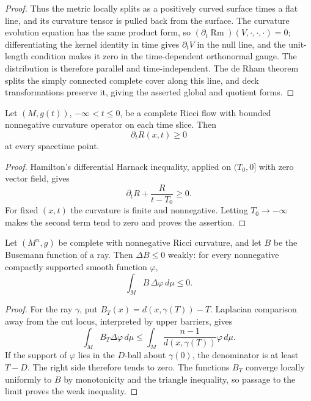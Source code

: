\begin{proof}
Thus the metric locally splits as a positively curved surface times a flat
line, and its curvature tensor is pulled back from the surface.  The
curvature evolution equation has the same product form, so
$(\partial_t\operatorname{Rm})(V,\cdot,\cdot,\cdot)=0$; differentiating the
kernel identity in time gives $\partial_tV$ in the null line, and the
unit-length condition makes it zero in the time-dependent orthonormal gauge.
The distribution is therefore parallel and time-independent.  The de Rham
theorem splits the simply connected complete cover along this line, and deck
transformations preserve it, giving the asserted global and quotient forms.
\end{proof}

\begin{theorem}
\label{thm:ancient-scalar-curvature-monotonicity}
\notready
Let $(M,g(t))$, $-\infty<t\le0$, be a complete Ricci flow with bounded
nonnegative curvature operator on each time slice.  Then
\[
 \partial_tR(x,t)\ge0
\]
at every spacetime point.
\end{theorem}

\begin{proof}
Hamilton's differential Harnack inequality, applied on $(T_0,0]$ with zero
vector field, gives
\[
 \partial_tR+\frac{R}{t-T_0}\ge0.
\]
For fixed $(x,t)$ the curvature is finite and nonnegative.  Letting
$T_0\to-\infty$ makes the second term tend to zero and proves the assertion.
\end{proof}

\begin{theorem}
\label{thm:busemann-function-superharmonicity}
\notready
Let $(M^n,g)$ be complete with nonnegative Ricci curvature, and let $B$ be
the Busemann function of a ray.  Then $\Delta B\le0$ weakly: for every
nonnegative compactly supported smooth function $\varphi$,
\[
 \int_M B\,\Delta\varphi\,d\mu\le0.
\]
\end{theorem}

\begin{proof}
For the ray $\gamma$, put
$B_T(x)=d(x,\gamma(T))-T$.  Laplacian comparison away from the cut locus,
interpreted by upper barriers, gives
\[
 \int_M B_T\Delta\varphi\,d\mu
 \le \int_M\frac{n-1}{d(x,\gamma(T))}\varphi\,d\mu.
\]
If the support of $\varphi$ lies in the $D$-ball about $\gamma(0)$, the
denominator is at least $T-D$.  The right side therefore tends to zero.
The functions $B_T$ converge locally uniformly to $B$ by monotonicity and
the triangle inequality, so passage to the limit proves the weak inequality.
\end{proof}

